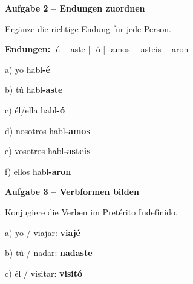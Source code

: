 \documentclass[11pt, a4paper]{article}
\newcommand{\fachfarbe}{spanisch}
\newcommand{\punktebox}[1]{\hfill\fbox{\small \_/#1}}
\newcommand{\lsg}[1]{\textcolor{loesung}{\textbf{#1}}}
\newenvironment{aufgabe}[1]{%
    \needspace{5\baselineskip}%
    \nopagebreak[4]%
    \vspace{10pt}
    \noindent\textbf{\textcolor{\fachfarbe}{Aufgabe #1}}
    \nopagebreak[4]%
    \vspace{5pt}
    \nopagebreak[4]%
    \begin{list}{}{\leftmargin=0pt}
    \item[]
}{%
    \end{list}
}
\begin{document}
\vspace{15pt}


\begin{aufgabe}{2 -- Endungen zuordnen}
Ergänze die richtige Endung für jede Person. \punktebox{6}
\end{aufgabe}

\noindent
\textbf{Endungen:} -é | -aste | -ó | -amos | -asteis | -aron

\vspace{0.5em}

\noindent
a) yo habl\lsg{-é}

\vspace{0.8em}

\noindent
b) tú habl\lsg{-aste}

\vspace{0.8em}

\noindent
c) él/ella habl\lsg{-ó}

\vspace{0.8em}

\noindent
d) nosotros habl\lsg{-amos}

\vspace{0.8em}

\noindent
e) vosotros habl\lsg{-asteis}

\vspace{0.8em}

\noindent
f) ellos habl\lsg{-aron}

\vspace{15pt}


\begin{aufgabe}{3 -- Verbformen bilden}
Konjugiere die Verben im Pretérito Indefinido. \punktebox{8}
\end{aufgabe}

\noindent
a) yo / viajar: \lsg{viajé}

\vspace{0.8em}

\noindent
b) tú / nadar: \lsg{nadaste}

\vspace{0.8em}

\noindent
c) él / visitar: \lsg{visitó}
\end{document}

